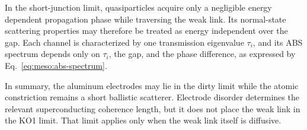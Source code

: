         In the short-junction limit, quasiparticles acquire only a negligible energy dependent propagation phase while traversing the weak link. Its normal-state scattering properties may therefore be treated as energy independent over the gap. Each channel is characterized by one transmission eigenvalue $\tau_i$, and its ABS spectrum depends only on $\tau_i$, the gap, and the phase difference, as expressed by Eq.~\eqref{eq:meso:abs-spectrum}.

        In summary, the aluminum electrodes may lie in the dirty limit while the atomic constriction remains a short ballistic scatterer. Electrode disorder determines the relevant superconducting coherence length, but it does not place the weak link in the KO1 limit. That limit applies only when the weak link itself is diffusive.

